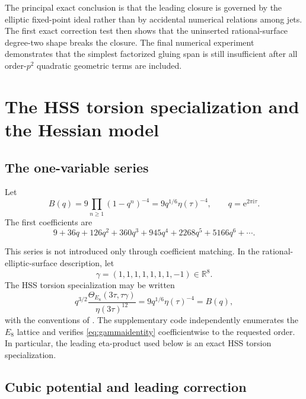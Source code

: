 \documentclass[11pt]{article}
\theoremstyle{definition}
\theoremstyle{remark}
\newcommand{\ii}{\mathrm{i}}
\newcommand{\e}{\mathrm{e}}
\newcommand{\R}{\mathbb{R}}
\begin{document}
The principal exact conclusion is that the leading closure is governed by the elliptic fixed-point ideal rather than by accidental numerical relations among jets.  The first exact correction test then shows that the uninserted rational-surface degree-two shape breaks the closure.  The final numerical experiment demonstrates that the simplest factorized gluing span is still insufficient after all order-\(p^2\) quadratic geometric terms are included.

\section{The HSS torsion specialization and the Hessian model}

\subsection{The one-variable series}

Let
\begin{equation}\label{eq:Bdef}
 B(q)=9\prod_{n\ge1}(1-q^n)^{-4}
     =9q^{1/6}\eta(\tau)^{-4},
 \qquad q=\e^{2\pi\ii\tau}.
\end{equation}
The first coefficients are
\[
 9+36q+126q^2+360q^3+945q^4+2268q^5+5166q^6+\cdots.
\]

This series is not introduced only through coefficient matching.  In the rational-elliptic-surface description, let
\[
 \gamma=(1,1,1,1,1,1,1,-1)\in\R^8.
\]
The HSS torsion specialization may be written
\begin{equation}\label{eq:gammaidentity}
 q^{3/2}\frac{\Theta_{E_8}(3\tau,\tau\gamma)}{\eta(3\tau)^{12}}
 =9q^{1/6}\eta(\tau)^{-4}=B(q),
\end{equation}
with the conventions of \cite{HST}.  The supplementary code independently enumerates the \(E_8\) lattice and verifies \eqref{eq:gammaidentity} coefficientwise to the requested order.  In particular, the leading eta-product used below is an exact HSS torsion specialization.

\subsection{Cubic potential and leading correction}
\end{document}
